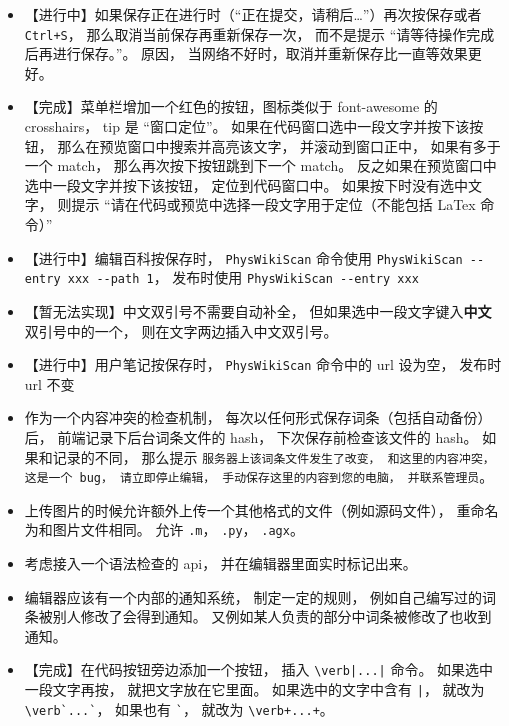 \begin{itemize}
\item 【进行中】如果保存正在进行时（“正在提交，请稍后…”）再次按保存或者 \verb|Ctrl+S|， 那么取消当前保存再重新保存一次， 而不是提示 “请等待操作完成后再进行保存。”。 原因， 当网络不好时，取消并重新保存比一直等效果更好。

\item 【完成】菜单栏增加一个红色的按钮，图标类似于 font-awesome 的 crosshairs， tip 是 “窗口定位”。 如果在代码窗口选中一段文字并按下该按钮， 那么在预览窗口中搜索并高亮该文字， 并滚动到窗口正中， 如果有多于一个 match， 那么再次按下按钮跳到下一个 match。 反之如果在预览窗口中选中一段文字并按下该按钮， 定位到代码窗口中。 如果按下时没有选中文字， 则提示 “请在代码或预览中选择一段文字用于定位（不能包括 LaTex 命令）”

\item 【进行中】编辑百科按保存时， \verb|PhysWikiScan| 命令使用 \verb|PhysWikiScan --entry xxx --path 1|， 发布时使用 \verb|PhysWikiScan --entry xxx|

\item 【暂无法实现】中文双引号不需要自动补全， 但如果选中一段文字键入\textbf{中文}双引号中的一个， 则在文字两边插入中文双引号。

\item 【进行中】用户笔记按保存时， \verb|PhysWikiScan| 命令中的 url 设为空， 发布时 url 不变

\item 作为一个内容冲突的检查机制， 每次以任何形式保存词条（包括自动备份）后， 前端记录下后台词条文件的 hash， 下次保存前检查该文件的 hash。 如果和记录的不同， 那么提示 \verb|服务器上该词条文件发生了改变， 和这里的内容冲突， 这是一个 bug， 请立即停止编辑， 手动保存这里的内容到您的电脑， 并联系管理员|。

\item 上传图片的时候允许额外上传一个其他格式的文件（例如源码文件）， 重命名为和图片文件相同。 允许 \verb|.m|， \verb|.py|， \verb|.agx|。

\item 考虑接入一个语法检查的 api， 并在编辑器里面实时标记出来。

\item 编辑器应该有一个内部的通知系统， 制定一定的规则， 例如自己编写过的词条被别人修改了会得到通知。 又例如某人负责的部分中词条被修改了也收到通知。

\item 【完成】在代码按钮旁边添加一个按钮， 插入 \verb`\verb|...|` 命令。 如果选中一段文字再按， 就把文字放在它里面。 如果选中的文字中含有 \verb`|`， 就改为 \verb|\verb`...`|， 如果也有 \verb|`|， 就改为 \verb|\verb+...+|。


\end{itemize}
